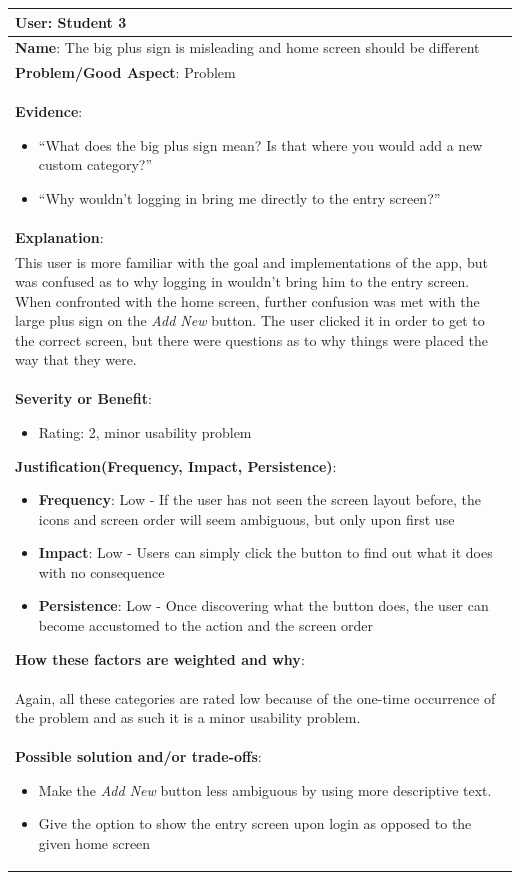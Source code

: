 \documentclass[pdftex,12pt,a4paper]{report}
\begin{document}
\begin{center}
	\begin{longtable}{|p{\textwidth}|}
	\hline
	\textbf{User}: Student 3\\
	\hline
	\textbf{Name}: The big plus sign is misleading and home screen should be different\\
	\hline
	\textbf{Problem/Good Aspect}: Problem\\
	\hline
	\textbf{Evidence}:
	\begin{itemize}
	\item{``What does the big plus sign mean? Is that where you would add a new custom category?''}
	\item{``Why wouldn't logging in bring me directly to the entry screen?''}
	\end{itemize}\\
	\hline
	\textbf{Explanation}:\\
	This user is more familiar with the goal and implementations of the app, but was confused as to why logging in wouldn't bring him to the entry screen. When confronted with the home screen, further confusion was met with the large plus sign on the \emph{Add New} button. The user clicked it in order to get to the correct screen, but there were questions as to why things were placed the way that they were.\\
	\hline
\textbf{Severity or Benefit}:
	\begin{itemize}
	\item{Rating: 2, minor usability problem}
	\end{itemize}
	\textbf{Justification(Frequency, Impact, Persistence)}:
	\begin{itemize}
	\item{\textbf{Frequency}:} Low - If the user has not seen the screen layout before, the icons and screen order will seem ambiguous, but only upon first use
	\item{\textbf{Impact}:} Low - Users can simply click the button to find out what it does with no consequence
	\item{\textbf{Persistence}:} Low - Once discovering what the button does, the user can become accustomed to the action and the screen order
	\end{itemize}
	\textbf{How these factors are weighted and why}:\\
	Again, all these categories are rated low because of the one-time occurrence of the problem and as such it is a minor usability problem.\\
	\hline
	\textbf{Possible solution and/or trade-offs}:
	\begin{itemize}
	\item{Make the \emph{Add New} button less ambiguous by using more descriptive text.}
	\item{Give the option to show the entry screen upon login as opposed to the given home screen}
	\end{itemize}\\
	\hline
	\end{longtable}
\end{center}
\end{document}

